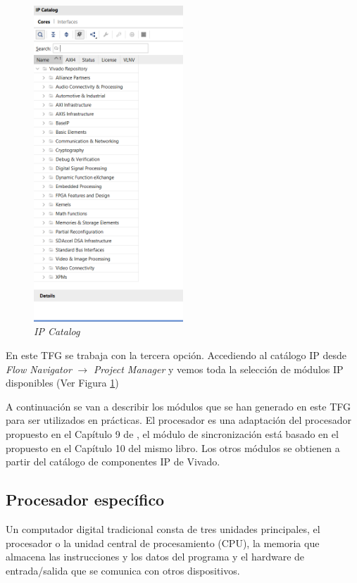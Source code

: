 \begin{figure}[H]
    \centering
    \includegraphics[width = 0.5\textwidth]{imagenes/catalogoip.png}
    \caption{\textit{IP Catalog}}\label{catalogo}
\end{figure}



En este TFG se trabaja con la tercera opción. Accediendo al catálogo IP desde \textit{Flow Navigator} $\rightarrow$ 
\textit{Project Manager} y vemos toda la selección de módulos IP disponibles (Ver Figura \ref{catalogo})

A continuación se van a describir los módulos que se han generado en este TFG para ser utilizados en prácticas. El procesador es una 
adaptación del procesador propuesto en el Capítulo 9 de \cite{hamblen2007rapid}, el módulo de sincronización está basado en el propuesto 
en el Capítulo 10 del mismo libro. Los otros módulos se obtienen a partir del catálogo de componentes IP de Vivado.

\subsection{Procesador específico}

Un computador digital tradicional consta de tres unidades principales, el procesador o la unidad central de procesamiento (CPU), 
la memoria que almacena las instrucciones y los datos del programa y el hardware de entrada/salida que se comunica con otros dispositivos.

